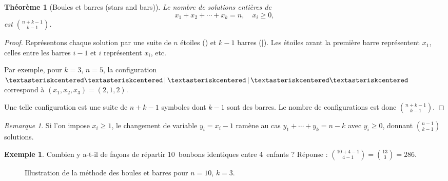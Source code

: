 \documentclass[12pt,a4paper,openany]{book}
\theoremstyle{definition}
\newtheorem{exemple}[definition]{Exemple}
\theoremstyle{plain}
\newtheorem{theoreme}[definition]{Théorème}
\theoremstyle{remark}
\newtheorem{remarque}[definition]{Remarque}
\begin{document}
\begin{theoreme}[Boules et barres (stars and bars)]\label{thm:boules-barres}
Le nombre de solutions entières de
\[
  x_1 + x_2 + \cdots + x_k = n, \quad x_i \geq 0,
\]
est $\displaystyle\binom{n+k-1}{k-1}$.
\end{theoreme}

\begin{proof}
Représentons chaque solution par une suite de $n$ étoiles (\textasteriskcentered)
et $k-1$ barres ($|$). Les étoiles avant la première barre représentent
$x_1$, celles entre les barres $i-1$ et $i$ représentent $x_i$, etc.

Par exemple, pour $k=3$, $n=5$, la configuration
$\textasteriskcentered\textasteriskcentered\,|\,\textasteriskcentered\,|\,\textasteriskcentered\textasteriskcentered$
correspond à $(x_1, x_2, x_3) = (2, 1, 2)$.

Une telle configuration est une suite de $n + k - 1$ symboles dont $k-1$
sont des barres. Le nombre de configurations est donc
$\binom{n+k-1}{k-1}$.
\end{proof}

\begin{remarque}\label{rem:boules-barres-strict}
Si l'on impose $x_i \geq 1$, le changement de variable $y_i = x_i - 1$
ramène au cas $y_1 + \cdots + y_k = n - k$ avec $y_i \geq 0$, donnant
$\binom{n-1}{k-1}$ solutions.
\end{remarque}

\begin{exemple}\label{ex:boules-barres}
Combien y a-t-il de façons de répartir 10~bonbons identiques entre 4~enfants ?
Réponse : $\binom{10+4-1}{4-1} = \binom{13}{3} = 286$.
\end{exemple}

\begin{figure}[ht]
\centering
{}
\caption{Illustration de la méthode des boules et barres pour $n=10$, $k=3$.}
\label{fig:boules-barres}
\end{figure}
\end{document}
